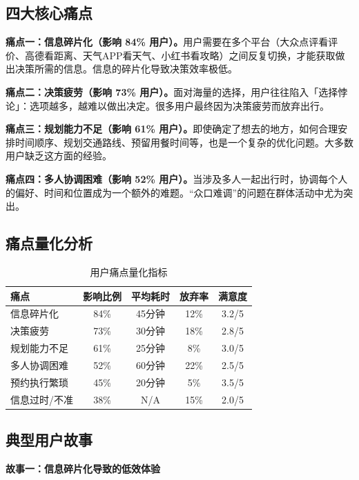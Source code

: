 \documentclass[12pt,a4paper]{ctexart}
\begin{document}
\subsection{四大核心痛点}

\textbf{痛点一：信息碎片化（影响 84\% 用户）。}用户需要在多个平台（大众点评看评价、高德看距离、天气APP看天气、小红书看攻略）之间反复切换，才能获取做出决策所需的信息。信息的碎片化导致决策效率极低。

\textbf{痛点二：决策疲劳（影响 73\% 用户）。}面对海量的选择，用户往往陷入「选择悖论」：选项越多，越难以做出决定。很多用户最终因为决策疲劳而放弃出行。

\textbf{痛点三：规划能力不足（影响 61\% 用户）。}即使确定了想去的地方，如何合理安排时间顺序、规划交通路线、预留用餐时间等，也是一个复杂的优化问题。大多数用户缺乏这方面的经验。

\textbf{痛点四：多人协调困难（影响 52\% 用户）。}当涉及多人一起出行时，协调每个人的偏好、时间和位置成为一个额外的难题。``众口难调''的问题在群体活动中尤为突出。

\subsection{痛点量化分析}

\begin{table}[H]
\centering
\caption{用户痛点量化指标}
\label{tab:pain-metric}
\renewcommand{\arraystretch}{1.3}
\begin{tabularx}{\textwidth}{Xcccc}
\toprule
\textbf{痛点} & \textbf{影响比例} & \textbf{平均耗时} & \textbf{放弃率} & \textbf{满意度} \\
\midrule
信息碎片化 & 84\% & 45分钟 & 12\% & 3.2/5 \\
决策疲劳 & 73\% & 30分钟 & 18\% & 2.8/5 \\
规划能力不足 & 61\% & 25分钟 & 8\% & 3.0/5 \\
多人协调困难 & 52\% & 60分钟 & 22\% & 2.5/5 \\
预约执行繁琐 & 45\% & 20分钟 & 5\% & 3.5/5 \\
信息过时/不准 & 38\% & N/A & 15\% & 2.0/5 \\
\bottomrule
\end{tabularx}
\end{table}

\subsection{典型用户故事}

\textbf{故事一：信息碎片化导致的低效体验}
\end{document}

